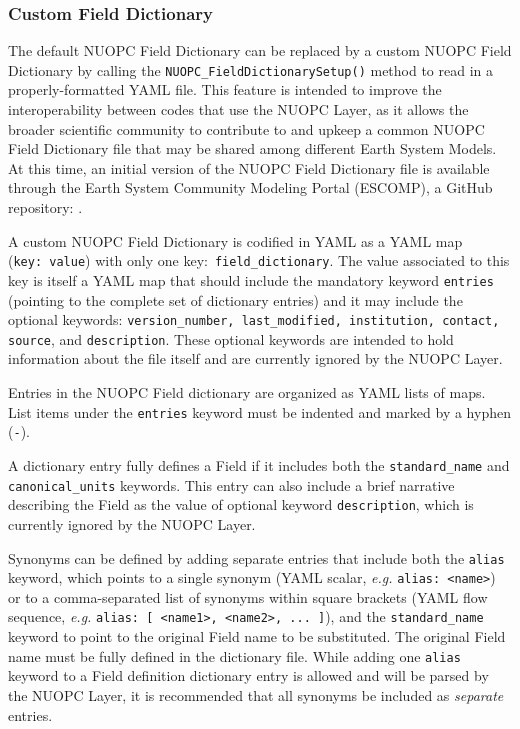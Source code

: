 \subsubsection{Custom Field Dictionary}
\label{fd:custom}

The default NUOPC Field Dictionary can be replaced by a custom NUOPC Field Dictionary by calling the {\tt NUOPC\_FieldDictionarySetup()} method to read in a properly-formatted YAML file. This feature is intended to improve the interoperability between codes that use the NUOPC Layer, as it allows the broader scientific community to contribute to and upkeep a common NUOPC Field Dictionary file that may be shared among different Earth System Models. At this time, an initial version of the NUOPC Field Dictionary file is available through the Earth System Community Modeling Portal (ESCOMP), a GitHub repository: .

A custom NUOPC Field Dictionary is codified in YAML as a YAML map ({\tt key:\ value}) with only one key:~{\tt field\_dictionary}. The value associated to this key is itself a YAML map that should include the mandatory keyword {\tt entries} (pointing to the complete set of dictionary entries) and it may include the optional keywords: {\tt version\_number, last\_modified, institution, contact, source}, and {\tt description}. These optional keywords are intended to hold information about the file itself and are currently ignored by the NUOPC Layer.

Entries in the NUOPC Field dictionary are organized as YAML lists of maps. List items under the {\tt entries} keyword must be indented and marked by a hyphen ({\tt -}).

A dictionary entry fully defines a Field if it includes both the {\tt standard\_name} and {\tt canonical\_units} keywords. This entry can also include a brief narrative describing the Field as the value of optional keyword {\tt description}, which is currently ignored by the NUOPC Layer.

Synonyms can be defined by adding separate entries that include both the {\tt alias} keyword, which points to a single synonym (YAML scalar, {\it e.g.\/} {\tt alias:~<name>}) or to a comma-separated list of synonyms within square brackets (YAML flow sequence, {\it e.g.\/} {\tt alias:~[ <name1>, <name2>, ... ]}), and the {\tt standard\_name} keyword to point to the original Field name to be substituted. The original Field name must be fully defined in the dictionary file. While adding one {\tt alias} keyword to a Field definition dictionary entry is allowed and will be parsed by the NUOPC Layer, it is recommended that all synonyms be included as {\it separate} entries.

